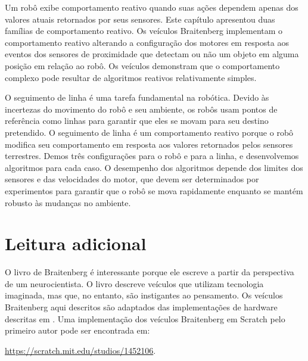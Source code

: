Um robô exibe comportamento reativo quando suas ações dependem apenas dos valores atuais retornados por seus sensores. Este capítulo apresentou duas famílias de comportamento reativo. Os veículos Braitenberg implementam o comportamento reativo alterando a configuração dos motores em resposta aos eventos dos sensores de proximidade que detectam ou não um objeto em alguma posição em relação ao robô. Os veículos demonstram que o comportamento complexo pode resultar de algoritmos reativos relativamente simples.

O seguimento de linha é uma tarefa fundamental na robótica. Devido às incertezas do movimento do robô e seu ambiente, os robôs usam pontos de referência como linhas para garantir que eles se movam para seu destino pretendido. O seguimento de linha é um comportamento reativo porque o robô modifica seu comportamento em resposta aos valores retornados pelos sensores terrestres. Demos três configurações para o robô e para a linha, e desenvolvemos algoritmos para cada caso. O desempenho dos algoritmos depende dos limites dos sensores e das velocidades do motor, que devem ser determinados por experimentos para garantir que o robô se mova rapidamente enquanto se mantém robusto às mudanças no ambiente.

\section{Leitura adicional}

O livro de Braitenberg \cite{valentino} é interessante porque ele escreve a partir da perspectiva de um neurocientista. O livro descreve veículos que utilizam tecnologia imaginada, mas que, no entanto, são instigantes ao pensamento. Os veículos Braitenberg aqui descritos são adaptados das implementações de hardware descritas em \cite{creatures}. Uma implementação dos veículos Braitenberg em Scratch pelo primeiro autor pode ser encontrada em:\par\noindent\url{https://scratch.mit.edu/studios/1452106}.

